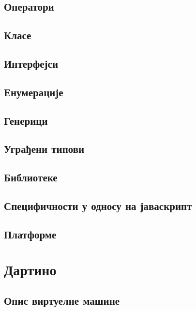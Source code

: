 \documentclass[12pt,oneside]{memoir}
\begin{document}
\section{Оператори}

\section{Класе}

\section{Интерфејси}

\section{Енумерације}

\section{Генерици}

\section{Уграђени типови}

\section{Библиотеке}

\section{Специфичности у односу на јаваскрипт}

\section{Платформе}


\chapter{Дартино}
\label{chp:dartino}
\section{Опис виртуелне машине}
\end{document}
